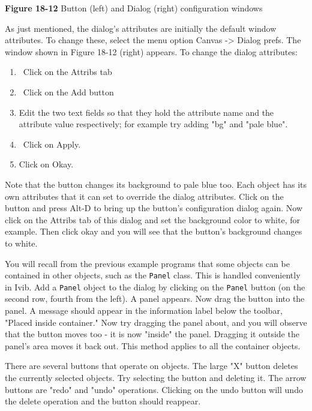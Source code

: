 {\sffamily\bfseries Figure 18-12}
{\sffamily Button (left) and Dialog (right) configuration windows}

\bigskip

As just mentioned, the dialog's attributes are
initially the default window attributes. To change these, select the
menu option Canvas -{\textgreater} Dialog prefs. The window shown in
Figure 18-12 (right) appears. To change the dialog attributes:

\begin{enumerate}
\item \ Click on the Attribs tab

\item \ Click on the Add button


\item Edit the two text fields so that they hold the attribute name and
the attribute value respectively; for example try adding
"bg" and "pale blue".
\item \ Click on Apply.

\item Click on Okay.
\end{enumerate}

\bigskip

Note that the button changes its background to pale blue too. Each
object has its own attributes that it can set to override the dialog
attributes. Click on the button and press Alt-D to bring up the
button's configuration dialog again. Now click on the
Attribs tab of this dialog and set the background color to white, for
example. Then click okay and you will see that the
button's background changes to white.

You will recall from the previous example programs that some objects can
be contained in other objects, such as the \texttt{Panel} class. This
is handled conveniently in Ivib. Add a \texttt{Panel} object to the
dialog by clicking on the \texttt{Panel} button (on the second row,
fourth from the left). A panel appears. Now drag the button into the
panel. A message should appear in the information label below the
toolbar, "Placed inside container." Now try
dragging the panel about, and you will observe that the button moves
too - it is now "inside" the panel.
Dragging it outside the panel's area moves it back
out. This method applies to all the container objects.

There are several buttons that operate on objects. The large
"X" button deletes the currently selected
objects. Try selecting the button and deleting it. The arrow buttons
are "redo" and
"undo" operations. Clicking on the undo
button will undo the delete operation and the button should reappear.

